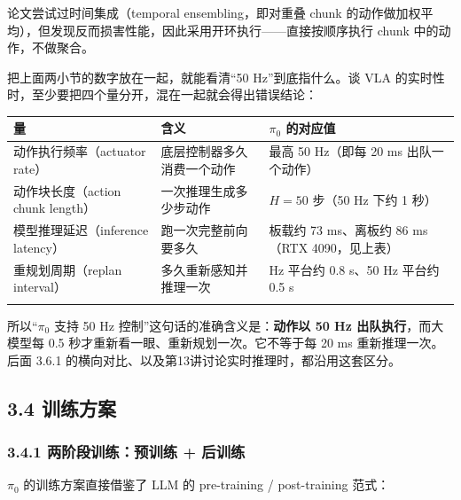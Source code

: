 \documentclass[
  chinese,
]{ctexart}
\begin{document}
论文尝试过时间集成（temporal ensembling，即对重叠 chunk
的动作做加权平均），但发现反而损害性能，因此采用开环执行------直接按顺序执行
chunk 中的动作，不做聚合。

把上面两小节的数字放在一起，就能看清``50 Hz''到底指什么。谈 VLA
的实时性时，至少要把四个量分开，混在一起就会得出错误结论：

\begin{center}
\begin{tabular}{@{}>{\raggedright\arraybackslash}p{} >{\raggedright\arraybackslash}p{} >{\raggedright\arraybackslash}p{}@{}}
\toprule\noalign{}
量 & 含义 & \(\pi_0\) 的对应值 \\
\midrule\noalign{}
动作执行频率（actuator rate） & 底层控制器多久消费一个动作 & 最高 50 Hz（即每 20 ms 出队一个动作） \\
动作块长度（action chunk length） & 一次推理生成多少步动作 & \(H = 50\) 步（50 Hz 下约 1 秒） \\
模型推理延迟（inference latency） & 跑一次完整前向要多久 & 板载约 73 ms、离板约 86 ms（RTX 4090，见上表） \\
重规划周期（replan interval） & 多久重新感知并推理一次 & 20 Hz 平台约 0.8 s、50 Hz 平台约 0.5 s \\
\bottomrule\noalign{}
\end{tabular}
\end{center}

所以``\(\pi_0\) 支持 50 Hz 控制''这句话的准确含义是：\textbf{动作以 50
Hz 出队执行}，而大模型每 0.5 秒才重新看一眼、重新规划一次。它不等于每 20
ms 重新推理一次。后面 3.6.1
的横向对比、以及第13讲讨论实时推理时，都沿用这套区分。

\subsection{3.4 训练方案}\label{ux8badux7ec3ux65b9ux6848}

\subsubsection{3.4.1 两阶段训练：预训练 +
后训练}\label{ux4e24ux9636ux6bb5ux8badux7ec3ux9884ux8badux7ec3-ux540eux8badux7ec3}

\(\pi_0\) 的训练方案直接借鉴了 LLM 的 pre-training / post-training
范式：
\end{document}
